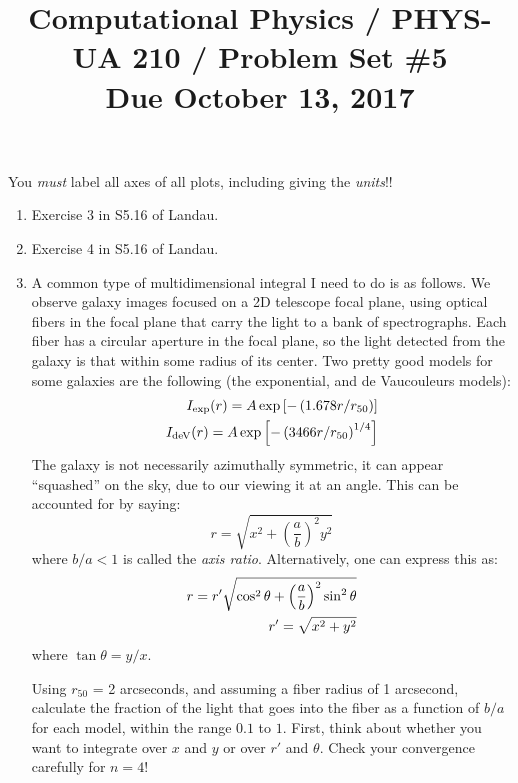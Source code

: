 \documentclass[11pt, preprint]{aastex}
\begin{document}
\title{\bf Computational Physics / PHYS-UA 210 / Problem Set \#5
\\ Due October 13, 2017 }

You {\it must} label all axes of all plots, including giving the {\it
  units}!!

\begin{enumerate}
  \item Exercise 3 in S5.16 of Landau.
  \item Exercise 4 in S5.16 of Landau.
  \item A common type of multidimensional integral I need to do is as
    follows. We observe galaxy images focused on a 2D telescope focal
    plane, using optical fibers in the focal plane that carry the
    light to a bank of spectrographs. Each fiber has a circular
    aperture in the focal plane, so the light detected from the galaxy
    is that within some radius of its center. Two pretty good models
    for some galaxies are the following (the exponential, and de
    Vaucouleurs models): 
    \begin{eqnarray}
     I_{\rm exp}(r) = A \exp\left[- \left(1.678 r/r_{50}\right)\right] \cr
     I_{\rm deV}(r) = A \exp\left[- \left(3466 r/r_{50}\right)^{1/4}\right]
    \end{eqnarray}
    The galaxy is not necessarily azimuthally symmetric, it can appear
    ``squashed'' on the sky, due to our viewing it at an angle. This
    can be accounted for by saying:
    \begin{equation}
      r = \sqrt{x^2 + \left(\frac{a}{b} \right)^2 y^2}
    \end{equation}
    where $b/a < 1$ is called the {\it axis ratio}. Alternatively, one
    can express this as:
    \begin{eqnarray}
      r = r' \sqrt{\cos^2\theta +
        \left(\frac{a}{b}\right)^2\sin^2\theta} \cr
      r' = \sqrt{x^2 + y^2}
    \end{eqnarray}
    where $\tan \theta = y/x$. 
    
   Using $r_{50}$ = 2 arcseconds, and assuming a fiber radius of 1
   arcsecond, calculate the fraction of the light that goes into the
   fiber as a function of $b/a$ for each model, within the range $0.1$
   to $1$. First, think about whether you want to integrate over $x$
   and $y$ or over $r'$ and $\theta$. Check your convergence carefully
   for $n=4$!
\end{enumerate}
\end{document}
